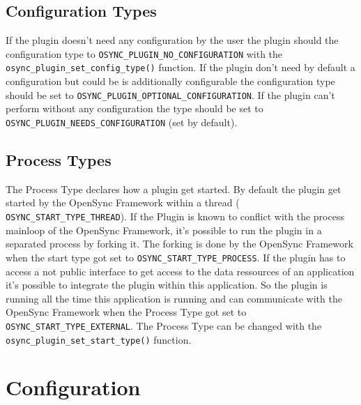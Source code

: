 \subsection{Configuration Types}
If the plugin doesn't need any configuration by the user the plugin should the
configuration type to \verb|OSYNC_PLUGIN_NO_CONFIGURATION| with the
\verb|osync_plugin_set_config_type()| function. If the plugin don't need by
default a configuration but could be is additionally configurable the
configuration type should be set to \verb|OSYNC_PLUGIN_OPTIONAL_CONFIGURATION|. 
If the plugin can't perform without any configuration the type should be set
to\\ \verb|OSYNC_PLUGIN_NEEDS_CONFIGURATION| (set by default).
\subsection{Process Types}
The Process Type declares how a plugin get started. By default the plugin get
started by the OpenSync Framework within a thread (
\verb|OSYNC_START_TYPE_THREAD|). If the Plugin is known to conflict with the 
process mainloop of the OpenSync Framework, it's possible to run the plugin in 
a separated process by forking it. The forking is done by the OpenSync
Framework when the start type got set to \verb|OSYNC_START_TYPE_PROCESS|. If the
plugin has to access a not public interface to get access to the data ressources
of an application it's possible to integrate the plugin within this application.
So the plugin is running all the time this application is running and can
communicate with the OpenSync Framework when the Process Type got set to 
\verb|OSYNC_START_TYPE_EXTERNAL|. The Process Type can be changed with the 
\verb|osync_plugin_set_start_type()| function. 
\section{Configuration}

